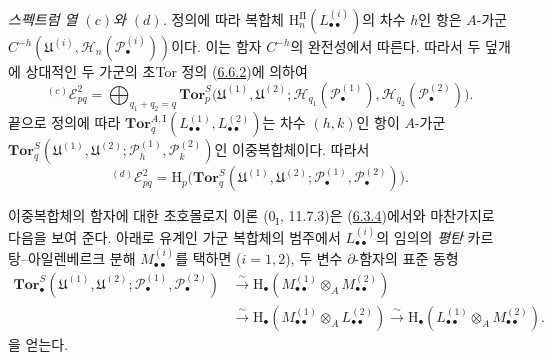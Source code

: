 \begin{env}[6.6.5]
\label{III.6.6.5-fr}
\emph{스펙트럼 열 $(c)$와 $(d)$.}
정의에 따라 복합체
$\mathrm H_n^{\mathrm{II}}(L_{\bullet\bullet}^{(i)})$의 차수 $h$인
항은 $A$-가군
$C^{-h}(\mathfrak U^{(i)},\mathscr H_n(\mathscr P_\bullet^{(i)}))$이다.
이는 함자 $C^{-h}$의 완전성에서 따른다. 따라서 두 덮개에 상대적인
두 가군의 초Tor 정의 (\hyperref[III.6.6.2-fr]{6.6.2})에 의하여
\[
  {}^{(c)}\mathscr E_{pq}^2
  =\bigoplus_{q_1+q_2=q}
   \mathbf{Tor}_p^S
   \bigl(\mathfrak U^{(1)},\mathfrak U^{(2)};
         \mathscr H_{q_1}(\mathscr P_\bullet^{(1)}),
         \mathscr H_{q_2}(\mathscr P_\bullet^{(2)})\bigr).
\]
끝으로 정의에 따라
$\mathbf{Tor}_q^{A,\mathrm I}
(L_{\bullet\bullet}^{(1)},L_{\bullet\bullet}^{(2)})$는 차수 $(h,k)$인
항이 $A$-가군
$\mathbf{Tor}_q^S
(\mathfrak U^{(1)},\mathfrak U^{(2)};
 \mathscr P_h^{(1)},\mathscr P_k^{(2)})$인 이중복합체이다. 따라서
\[
  {}^{(d)}\mathscr E_{pq}^2
  =\mathrm H_p\bigl(
    \mathbf{Tor}_q^S
    (\mathfrak U^{(1)},\mathfrak U^{(2)};
     \mathscr P_\bullet^{(1)},\mathscr P_\bullet^{(2)})\bigr).
\]
\end{env}

\begin{env}[6.6.6]
\label{III.6.6.6-fr}
이중복합체의 함자에 대한 초호몰로지 이론
($0_{\mathrm I}$, 11.7.3)은 (\hyperref[III.6.3.4-fr]{6.3.4})에서와
마찬가지로 다음을 보여 준다. 아래로 유계인 가군 복합체의 범주에서
$L_{\bullet\bullet}^{(i)}$의 임의의 \emph{평탄}
카르탕--아일렌베르크 분해 $M_{\bullet\bullet}^{(i)}$를 택하면
($i=1,2$), 두 변수 $\partial$-함자의 표준 동형
\[
\begin{aligned}
  \mathbf{Tor}_\bullet^S
  (\mathfrak U^{(1)},\mathfrak U^{(2)};
   \mathscr P_\bullet^{(1)},\mathscr P_\bullet^{(2)})
  &\xrightarrow{\sim}
   \mathrm H_\bullet
   (M_{\bullet\bullet}^{(1)}\otimes_A M_{\bullet\bullet}^{(2)})\\
  &\xrightarrow{\sim}
   \mathrm H_\bullet
   (M_{\bullet\bullet}^{(1)}\otimes_A L_{\bullet\bullet}^{(2)})
   \xrightarrow{\sim}
   \mathrm H_\bullet
   (L_{\bullet\bullet}^{(1)}\otimes_A M_{\bullet\bullet}^{(2)}).
\end{aligned}
\tag{6.6.6.1}\label{III.6.6.6.1.fr}
\]
을 얻는다.
\end{env}


